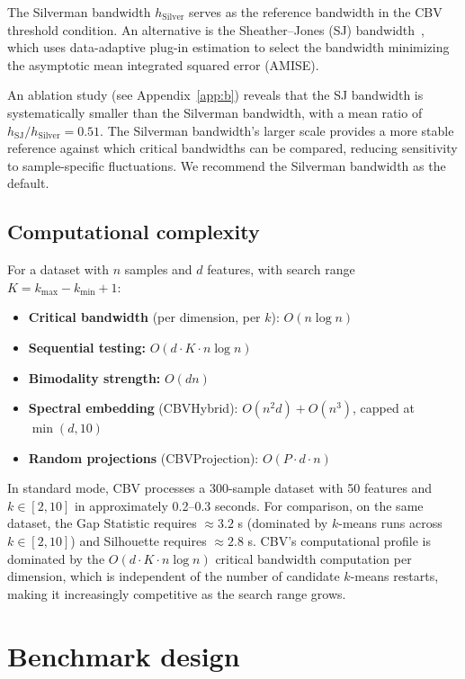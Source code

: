 \documentclass[journal]{IEEEtran}
\begin{document}
The Silverman bandwidth $h_{\mathrm{Silver}}$ serves as the reference bandwidth in the CBV threshold condition. An alternative is the Sheather--Jones (SJ) bandwidth~\cite{sheather1991reliable}, which uses data-adaptive plug-in estimation to select the bandwidth minimizing the asymptotic mean integrated squared error (AMISE).

An ablation study (see Appendix~\ref{app:b}) reveals that the SJ bandwidth is systematically smaller than the Silverman bandwidth, with a mean ratio of $h_{\mathrm{SJ}} / h_{\mathrm{Silver}} = 0.51$. The Silverman bandwidth's larger scale provides a more stable reference against which critical bandwidths can be compared, reducing sensitivity to sample-specific fluctuations. We recommend the Silverman bandwidth as the default.

\subsection{Computational complexity}
\label{sec:complexity}

For a dataset with $n$ samples and $d$ features, with search range $K = k_{\max} - k_{\min} + 1$:

\begin{itemize}
    \item \textbf{Critical bandwidth} (per dimension, per $k$): $O(n \log n)$
    \item \textbf{Sequential testing:} $O(d \cdot K \cdot n \log n)$
    \item \textbf{Bimodality strength:} $O(dn)$
    \item \textbf{Spectral embedding} (CBVHybrid): $O(n^2 d) + O(n^3)$, capped at $\min(d, 10)$
    \item \textbf{Random projections} (CBVProjection): $O(P \cdot d \cdot n)$
\end{itemize}

In standard mode, CBV processes a 300-sample dataset with 50 features and $k \in [2, 10]$ in approximately 0.2--0.3 seconds. For comparison, on the same dataset, the Gap Statistic requires $\approx 3.2$ s (dominated by $k$-means runs across $k \in [2,10]$) and Silhouette requires $\approx 2.8$ s. CBV's computational profile is dominated by the $O(d \cdot K \cdot n \log n)$ critical bandwidth computation per dimension, which is independent of the number of candidate $k$-means restarts, making it increasingly competitive as the search range grows.

\section{Benchmark design}
\label{sec:benchmark}
\end{document}
